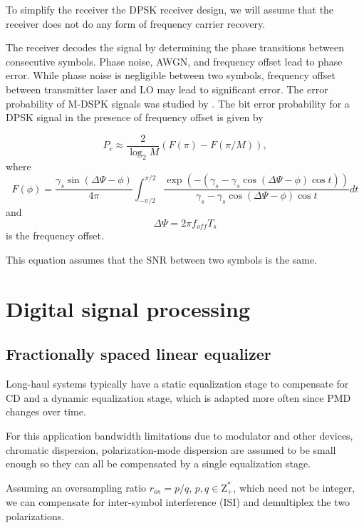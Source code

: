 \documentclass[a4paper]{article}
\begin{document}
To simplify the receiver the DPSK receiver design, we will assume that the receiver does not do any form of frequency carrier recovery. 

The receiver decodes the signal by determining the phase transitions between consecutive symbols. Phase noise, AWGN, and frequency offset lead to phase error. While phase noise is negligible between two symbols, frequency offset between transmitter laser and LO may lead to significant error. The error probability of M-DSPK signals was studied by \cite{Pawula2001}. The bit error probability for a DPSK signal in the presence of frequency offset is given by

\begin{equation}
P_e \approx \frac{2}{\log_2M}(F(\pi) - F(\pi/M)),
\end{equation}
where
\begin{equation}
F(\phi) = \frac{\gamma_s\sin(\Delta\Psi-\phi)}{4\pi}\int_{-\pi/2}^{\pi/2} \frac{\exp(-(\gamma_s -\gamma_s\cos(\Delta\Psi - \phi)\cos t))}{\gamma_s -\gamma_s\cos(\Delta\Psi - \phi)\cos t}dt
\end{equation}
and 
\begin{equation}
\Delta\Psi = 2\pi f_{off}T_s
\end{equation}
is the frequency offset.

This equation assumes that the SNR between two symbols is the same.

\section{Digital signal processing}

\subsection{Fractionally spaced linear equalizer}

Long-haul systems typically have a static equalization stage to compensate for CD and a dynamic equalization stage, which is adapted more often since PMD changes over time.

For this application bandwidth limitations due to modulator and other devices, chromatic dispersion, polarization-mode dispersion are assumed to be small enough so they can all be compensated by a single equalization stage. 

Assuming an oversampling ratio $r_{os} = p/q$, $p, q \in \mathrm{Z^*_+}$, which need not be integer, we can compensate for inter-symbol interference (ISI) and demultiplex the two polarizations.
\end{document}
